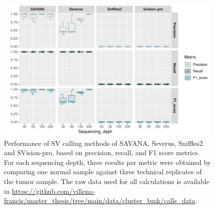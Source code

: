 \begin{figure}[H]
    \centering
    \includegraphics[width=\textwidth]{data/cluster_bmk/perform_calls.pdf}
    \caption[Performance of evaluated SV calling methods]{Performance of SV calling
    methods of SAVANA, Severus, Sniffles2 and SVision-pro, based on precision, 
    recall, and F1 score metrics. For each sequencing depth, three results per 
    metric were obtained by comparing one normal sample against three technical 
    replicates of the tumor sample. The raw data used for all calculations is 
    available in 
    \url{https://github.com/villena-francis/master_thesis/tree/main/data/cluster_bmk/calls_data}.}
    \label{fig:perform_calls}
\end{figure}